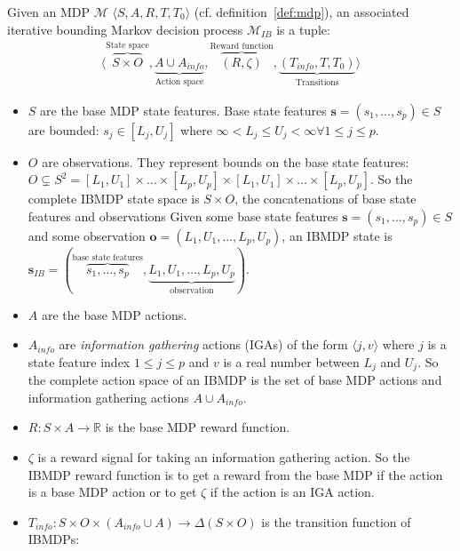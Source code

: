 \begin{definition}\label{def:ibmdp}
Given an MDP $\mathcal{M}$ $\langle S, A, R, T, T_0 \rangle$ (cf. definition~\ref{def:mdp}), an associated iterative bounding Markov decision process $\mathcal{M}_{IB}$ is a tuple:
\begin{align*}
    \langle \overbrace{S \times O}^{\text{State space}}, \underbrace{A \cup A_{info}}_{\text{Action space}}, \overbrace{(R, \zeta)}^{\text{Reward function}}, \underbrace{(T_{info}, T, T_0)}_{\text{Transitions}}\rangle
\end{align*}

\begin{itemize}
\item $S$ are the base MDP state features. Base state features $\boldsymbol{s} = (s_1, \dots, s_p)\in S$ are bounded: $s_j \in [L_j, U_j]$ where $\infty < L_j \leq U_j < \infty \forall 1\leq j \leq p$.
\item $O$ are observations. They represent bounds on the base state features: $O\subsetneq S^2 =  [L_1, U_1]\times \dots \times [L_p, U_p] \times [L_1, U_1]\times \dots \times [L_p, U_p]$. So the complete IBMDP state space is $S \times O$, the concatenations of base state features and observations
Given some base state features $\boldsymbol{s} = (s_1, \dots, s_p)\in S$ and some observation $\boldsymbol{o} = (L_1, U_1, \dots, L_p, U_p)$, an IBMDP state is $\boldsymbol{s}_{IB} = (\overbrace{s_1, \dots, s_p}^{\text{base state features}}, \underbrace{L_1, U_1, \dots, L_p, U_p}_{\text{observation}})$.
\item $A$ are the base MDP actions.
\item $A_{info}$ are \textit{information gathering} actions (IGAs) of the form $\langle j, v \rangle$ where $j$ is a state feature index $1 \leq j \leq p$ and $v$ is a real number between $L_j$ and $U_j$. So the complete action space of an IBMDP is the set of base MDP actions and information gathering actions $A \cup A_{info}$.
\item $R: S\times A \rightarrow \mathbb{R}$ is the base MDP reward function.
\item $\zeta$ is a reward signal for taking an information gathering action.
So the IBMDP reward function is to get a reward from the base MDP if the action is a base MDP action or to get $\zeta$ if the action is an IGA action.
\item $T_{info}: S\times O \times( A_{info} \cup A )\rightarrow \Delta (S\times O)$ is the transition function of IBMDPs: 

\end{itemize}
\end{definition}
